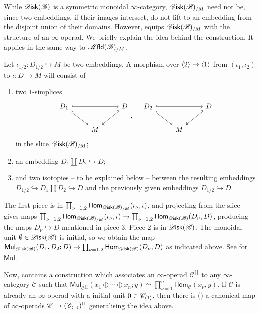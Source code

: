 \documentclass[../text]{subfiles}
\begin{document}
    While $\disk(\bstr)$ is a symmetric monoidal $\infty$-category, $\disk(\bstr)_{/M}$ need not be, since two embeddings, if their images intersect, do not lift to an embedding from the disjoint union of their domains. However, \cite[Notation 1.21]{aft_fhstrat} equips $\disk(\bstr)_{/M}$ with the structure of an $\infty$-operad. We briefly explain the idea behind the construction. It applies in the same way to $\mfld(\bstr)_{/M}$.

    Let $\iota_{1/2}\colon D_{1/2}\hookrightarrow M$ be two embeddings. A morphism over $\langle 2 \rangle\to\langle 1 \rangle$ from $(\iota_{1},\iota_2)$ to $\iota\colon D\to M$ will consist of
    \begin{enumerate}
        \item two $1$-simplices
        \[
        \begin{tikzcd}
            D_{1}\ar[dr,hook]\ar[rr,hook] && D\ar[dl,hook']\\
            & M
        \end{tikzcd},\quad
        \begin{tikzcd}
            D_{2}\ar[dr,hook]\ar[rr,hook] && D\ar[dl,hook']\\
            & M
        \end{tikzcd}
        \]
        in the slice $\disk(\bstr)_{/M}$;
        \item an embedding $ D_1\amalg D_2\hookrightarrow D$;
        \item and two isotopies -- to be explained below -- between the resulting embeddings $D_{1/2}\hookrightarrow D_{1}\amalg D_2 \hookrightarrow D$ and the previously given embeddings $D_{1/2}\hookrightarrow D$.
    \end{enumerate}
    
    The first piece is in $\prod_{\nu=1,2}\mathsf{Hom}_{\disk(\bstr)_{/M}}(\iota_\nu,\iota)$, and projecting from the slice gives maps $\prod_{\nu=1,2}\mathsf{Hom}_{\disk(\bstr)_{/M}}(\iota_\nu,\iota)\to \prod_{\nu=1,2}\mathsf{Hom}_{\disk(\bstr)}(D_\nu,D)$, producing the maps $D_\nu\hookrightarrow D$ mentioned in piece 3. Piece 2 is in $\disk(\bstr)$. The monoidal unit $\emptyset\in\disk(\bstr)$ is initial, so we obtain the map $\mathsf{Mul}_{\disk(\bstr)}(D_1, D_2; D)\to\prod_{\nu=1,2}\mathsf{Hom}_{\disk(\bstr)}(D_\nu,D)$ as indicated above. See \cite[Notation 2.1.1.16]{lurie_ha} for $\mathsf{Mul}$.

    Now, \cite[§2.4.3]{lurie_ha} contains a construction which associates an $\infty$-operad $\mathscr{C}^{\amalg}$ to any $\infty$-category $\mathscr{C}$ such that $\mathsf{Mul}_{\mathscr{C}^{\amalg}}(x_1\oplus\cdots\oplus x_n; y)\simeq \prod_{\nu=1}^{n}\mathsf{Hom}_{\mathscr{C}}(x_\nu,y)$. If $\mathscr{C}$ is already an $\infty$-operad with a initial unit $0\in\mathscr{C}_{\langle 1 \rangle}$, then there is (\cite[Lemma 1.20]{aft_fhstrat}) a canonical map of $\infty$-operads $\mathscr{C}\to(\mathscr{C}_{\langle 1 \rangle})^\amalg$ generalising the idea above. 
    
\end{document}
